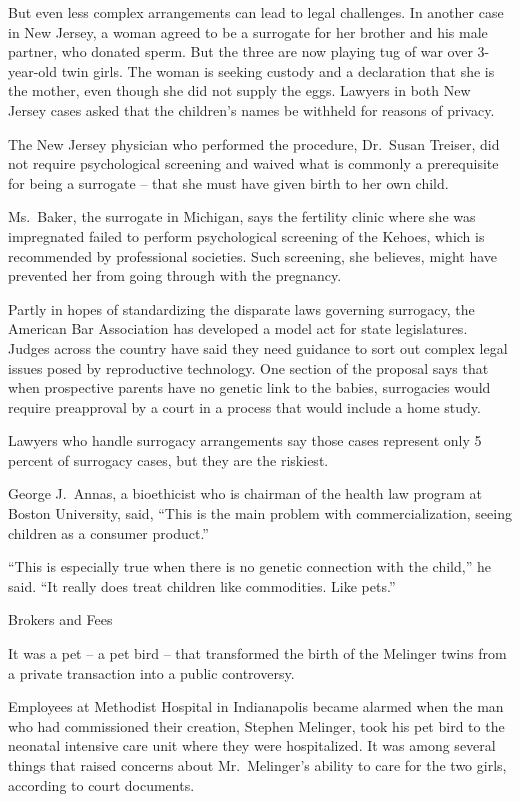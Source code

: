 ﻿\documentclass[12pt]{article}
\begin{document}
But even less complex arrangements can lead to legal challenges. In another case in New Jersey, a
woman agreed to be a surrogate for her brother and his male partner, who donated sperm. But the
three are now playing tug of war over 3-year-old twin girls. The woman is seeking custody and a
declaration that she is the mother, even though she did not supply the eggs. Lawyers in both New
Jersey cases asked that the children's names be withheld for reasons of privacy.

The New Jersey physician who performed the procedure, Dr.~Susan Treiser, did not require
psychological screening and waived what is commonly a prerequisite for being a surrogate -- that she
must have given birth to her own child.

Ms.~Baker, the surrogate in Michigan, says the fertility clinic where she was impregnated failed to
perform psychological screening of the Kehoes, which is recommended by professional societies. Such
screening, she believes, might have prevented her from going through with the pregnancy.

Partly in hopes of standardizing the disparate laws governing surrogacy, the American Bar
Association has developed a model act for state legislatures. Judges across the country have said
they need guidance to sort out complex legal issues posed by reproductive technology. One section of
the proposal says that when prospective parents have no genetic link to the babies, surrogacies
would require preapproval by a court in a process that would include a home study.

Lawyers who handle surrogacy arrangements say those cases represent only 5 percent of surrogacy
cases, but they are the riskiest.

George J.~Annas, a bioethicist who is chairman of the health law program at Boston University, said,
``This is the main problem with commercialization, seeing children as a consumer product.''

``This is especially true when there is no genetic connection with the child,'' he said. ``It really
does treat children like commodities. Like pets.''


Brokers and Fees

It was a pet -- a pet bird -- that transformed the birth of the Melinger twins from a private
transaction into a public controversy.

Employees at Methodist Hospital in Indianapolis became alarmed when the man who had commissioned
their creation, Stephen Melinger, took his pet bird to the neonatal intensive care unit where they
were hospitalized. It was among several things that raised concerns about Mr.~Melinger's ability to
care for the two girls, according to court documents.
\end{document}
